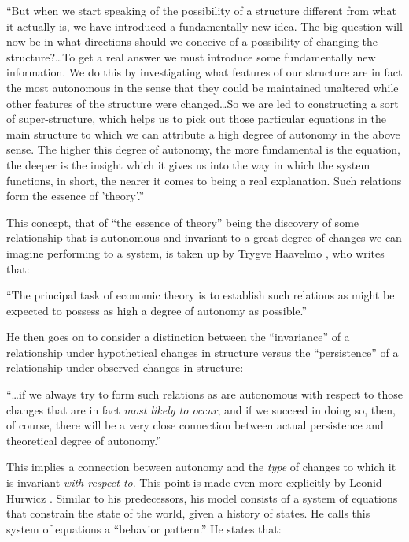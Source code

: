 \documentclass[a4paper,12pt]{article}
\begin{document}
\begin{displayquote}
``But when we start speaking of the possibility of a structure different from what it actually is, we have introduced a fundamentally new idea. The big question will now be in what directions should we conceive of a possibility of changing the structure?\ldots To get a real answer we must introduce some fundamentally new information. We do this by investigating what features of our structure are in fact the most autonomous in the sense that they could be maintained unaltered while other features of the structure were changed\ldots So we are led to constructing a sort of super-structure, which helps us to pick out those particular equations in the main structure to which we can attribute a high degree of autonomy in the above sense. The higher this degree of autonomy, the more fundamental is the equation, the deeper is the insight which it gives us into the way in which the system functions, in short, the nearer it comes to being a real explanation. Such relations form the essence of 'theory'.''
\end{displayquote}

This concept, that of ``the essence of theory'' being the discovery of some relationship that is autonomous and invariant to a great degree of changes we can imagine performing to a system, is taken up by Trygve Haavelmo \parencite*{Haavelmo1944}, who writes that:

\begin{displayquote}
``The principal task of economic theory is to establish such relations as might be expected to possess as high a degree of autonomy as possible.''
\end{displayquote}

He then goes on to consider a distinction between the ``invariance'' of a relationship under hypothetical changes in structure versus the ``persistence'' of a relationship under observed changes in structure:

\begin{displayquote}
``\ldots if we always try to form such relations as are autonomous with respect to those changes that are in fact \textit{most likely to occur}, and if we succeed in doing so, then, of course, there will be a very close connection between actual persistence and theoretical degree of autonomy.''
\end{displayquote}

This implies a connection between autonomy and the \textit{type} of changes to which it is invariant \textit{with respect to}. This point is made even more explicitly by Leonid Hurwicz \parencite*{Hurwicz1966}. Similar to his predecessors, his model consists of a system of equations that constrain the state of the world, given a history of states. He calls this system of equations a ``behavior pattern.'' He states that:
\end{document}
